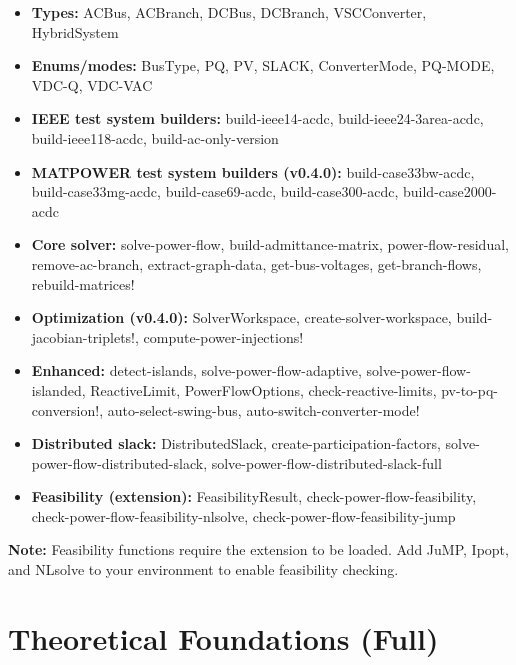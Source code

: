\documentclass[11pt]{article}
\def\code#1{#1}%
\def\_{-}%
\newcommand{\code}[1]{\nolinkurl{#1}}
\begin{document}
\begin{itemize}[leftmargin=*]
  \item \textbf{Types:} \code{ACBus}, \code{ACBranch}, \code{DCBus}, \code{DCBranch}, \code{VSCConverter}, \code{HybridSystem}
  \item \textbf{Enums/modes:} \code{BusType}, \code{PQ}, \code{PV}, \code{SLACK}, \code{ConverterMode}, \code{PQ\_MODE}, \code{VDC\_Q}, \code{VDC\_VAC}
  \item \textbf{IEEE test system builders:} \code{build\_ieee14\_acdc}, \code{build\_ieee24\_3area\_acdc}, \code{build\_ieee118\_acdc}, \code{build\_ac\_only\_version}
  \item \textbf{MATPOWER test system builders (v0.4.0):} \code{build\_case33bw\_acdc}, \code{build\_case33mg\_acdc}, \code{build\_case69\_acdc}, \code{build\_case300\_acdc}, \code{build\_case2000\_acdc}
  \item \textbf{Core solver:} \code{solve\_power\_flow}, \code{build\_admittance\_matrix}, \code{power\_flow\_residual}, \code{remove\_ac\_branch}, \code{extract\_graph\_data}, \code{get\_bus\_voltages}, \code{get\_branch\_flows}, \code{rebuild\_matrices!}
  \item \textbf{Optimization (v0.4.0):} \code{SolverWorkspace}, \code{create\_solver\_workspace}, \code{build\_jacobian\_triplets!}, \code{compute\_power\_injections!}
  \item \textbf{Enhanced:} \code{detect\_islands}, \code{solve\_power\_flow\_adaptive}, \code{solve\_power\_flow\_islanded}, \code{ReactiveLimit}, \code{PowerFlowOptions}, \code{check\_reactive\_limits}, \code{pv\_to\_pq\_conversion!}, \code{auto\_select\_swing\_bus}, \code{auto\_switch\_converter\_mode!}
  \item \textbf{Distributed slack:} \code{DistributedSlack}, \code{create\_participation\_factors}, \code{solve\_power\_flow\_distributed\_slack}, \code{solve\_power\_flow\_distributed\_slack\_full}
  \item \textbf{Feasibility (extension):} \code{FeasibilityResult}, \code{check\_power\_flow\_feasibility}, \code{check\_power\_flow\_feasibility\_nlsolve}, \code{check\_power\_flow\_feasibility\_jump}
\end{itemize}

\textbf{Note:} Feasibility functions require the extension to be loaded. Add \code{JuMP}, \code{Ipopt}, and \code{NLsolve} to your environment to enable feasibility checking.

\newpage
\part{Theoretical Foundations (Full)}\label{part:theory}
\end{document}
